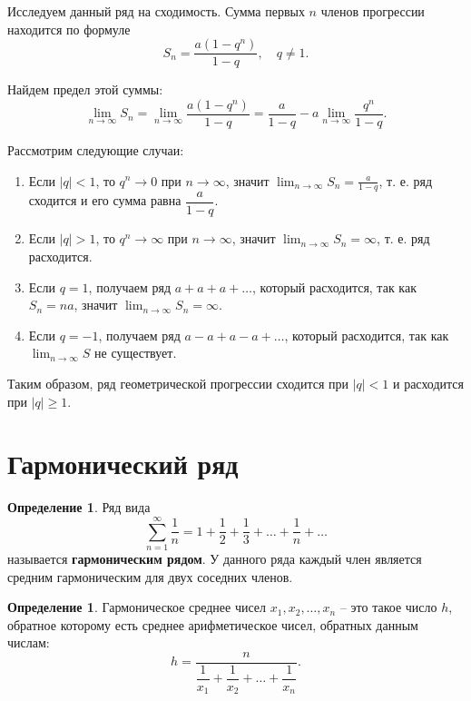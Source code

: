 \documentclass[a5paper, 11pt]{extbook}
\theoremstyle{definition}
\theoremstyle{definition}
\newtheorem{definition}{Определение}[section]
\theoremstyle{definition}
\newtheorem*{definition*}{Определение}
\begin{document}
Исследуем данный ряд на сходимость. Сумма первых \(n\) членов прогрессии находится по формуле
\[
    S_n = \frac{a (1 - q^n)}{1 - q},
    \quad
    q \neq 1.
\]

Найдем предел этой суммы:
\[
    \lim_{n \to \infty} S_n =
    \lim_{n \to \infty} \frac{a (1 - q^n)}{1 - q} =
    \frac{a}{1 - q} - a \lim_{n \to \infty} \frac{q^n}{1 - q}.
\]

Рассмотрим следующие случаи:
\begin{enumerate}
    \item Если \(|q| < 1\), то \(q^n \to 0\) при \(n \to \infty\), значит \(\displaystyle \lim_{n \to \infty} S_n = \frac{a}{1 - q}\), т. е. ряд сходится и его сумма равна \(\dfrac{a}{1 - q}\).
    \item Если \(|q| > 1\), то \(q^n \to \infty\) при \(n \to \infty\), значит \(\displaystyle \lim_{n \to \infty} S_n = \infty\), т. е. ряд расходится.
    \item Если \(q = 1\), получаем ряд \(a + a + a + \ldots\), который расходится, так как \(S_n = na\), значит \(\displaystyle \lim_{n \to \infty} S_n = \infty\).
    \item Если \(q = -1\), получаем ряд \(a - a + a - a + \ldots\), который расходится, так как \(\displaystyle \lim_{n \to \infty} S\) не существует.
\end{enumerate}

Таким образом, ряд геометрической прогрессии сходится при \(|q| < 1\) и расходится при \(|q| \geq 1\).

\section{Гармонический ряд}

\begin{definition*}
    Ряд вида
    \[
        \sum_{n = 1}^{\infty} \frac{1}{n} = 1 + \frac{1}{2} + \frac{1}{3} + \ldots + \frac{1}{n} + \ldots
    \]
    называется \textbf{гармоническим рядом}. У данного ряда каждый член является средним гармоническим для двух соседних членов.
\end{definition*}

\begin{definition}
    Гармоническое среднее чисел \(x_1, x_2, \ldots, x_n\) -- это такое число \(h\), обратное которому есть среднее арифметическое чисел, обратных данным числам:
    \[
        h = \frac{n}{\dfrac{1}{x_1} + \dfrac{1}{x_2} + \ldots + \dfrac{1}{x_n}}.
    \]
\end{definition}
\end{document}
